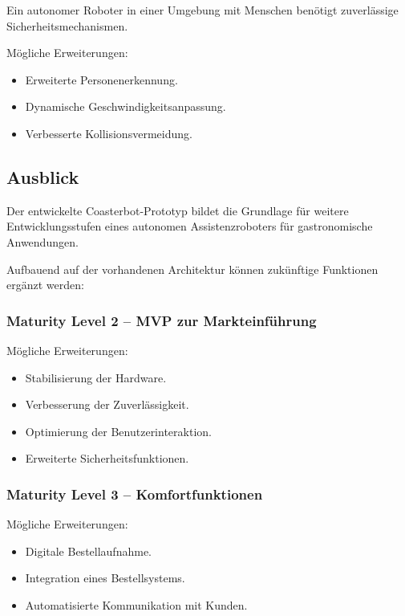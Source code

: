 \documentclass[
  a4paper,
  12pt,
  DIV=12,        %
  parskip=half,  %
  headings=small %
]{scrartcl}
\theoremstyle{definition}
\providecommand{\tightlist}{%
  \setlength{\itemsep}{0pt}\setlength{\parskip}{0pt}}
\theoremstyle{definition}
\begin{document}
Ein autonomer Roboter in einer Umgebung mit Menschen benötigt
zuverlässige Sicherheitsmechanismen.

Mögliche Erweiterungen:

\begin{itemize}
\tightlist
\item
  Erweiterte Personenerkennung.
\item
  Dynamische Geschwindigkeitsanpassung.
\item
  Verbesserte Kollisionsvermeidung.
\end{itemize}

\subsection{Ausblick}\label{ausblick}

Der entwickelte Coasterbot-Prototyp bildet die Grundlage für weitere
Entwicklungsstufen eines autonomen Assistenzroboters für gastronomische
Anwendungen.

Aufbauend auf der vorhandenen Architektur können zukünftige Funktionen
ergänzt werden:

\subsubsection{Maturity Level 2 -- MVP zur
Markteinführung}\label{maturity-level-2-mvp-zur-markteinfuxfchrung}

Mögliche Erweiterungen:

\begin{itemize}
\tightlist
\item
  Stabilisierung der Hardware.
\item
  Verbesserung der Zuverlässigkeit.
\item
  Optimierung der Benutzerinteraktion.
\item
  Erweiterte Sicherheitsfunktionen.
\end{itemize}

\subsubsection{Maturity Level 3 --
Komfortfunktionen}\label{maturity-level-3-komfortfunktionen}

Mögliche Erweiterungen:

\begin{itemize}
\tightlist
\item
  Digitale Bestellaufnahme.
\item
  Integration eines Bestellsystems.
\item
  Automatisierte Kommunikation mit Kunden.
\end{itemize}
\end{document}
